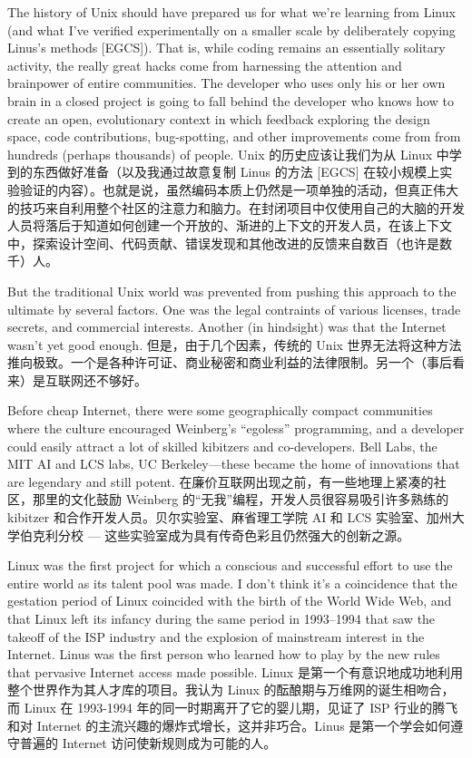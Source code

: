 \documentclass[a4paper,12pt,UTF8,twoside]{ctexbook}
\begin{document}
The history of Unix should have prepared us for what we're learning from Linux (and what I've verified experimentally on a smaller scale by deliberately copying Linus's methods [EGCS]). That is, while coding remains an essentially solitary activity, the really great hacks come from harnessing the attention and brainpower of entire communities. The developer who uses only his or her own brain in a closed project is going to fall behind the developer who knows how to create an open, evolutionary context in which feedback exploring the design space, code contributions, bug-spotting, and other improvements come from from hundreds (perhaps thousands) of people.
Unix 的历史应该让我们为从 Linux 中学到的东西做好准备（以及我通过故意复制 Linus 的方法 [EGCS] 在较小规模上实验验证的内容）。也就是说，虽然编码本质上仍然是一项单独的活动，但真正伟大的技巧来自利用整个社区的注意力和脑力。在封闭项目中仅使用自己的大脑的开发人员将落后于知道如何创建一个开放的、渐进的上下文的开发人员，在该上下文中，探索设计空间、代码贡献、错误发现和其他改进的反馈来自数百（也许是数千）人。

But the traditional Unix world was prevented from pushing this approach to the ultimate by several factors. One was the legal contraints of various licenses, trade secrets, and commercial interests. Another (in hindsight) was that the Internet wasn't yet good enough.
但是，由于几个因素，传统的 Unix 世界无法将这种方法推向极致。一个是各种许可证、商业秘密和商业利益的法律限制。另一个（事后看来）是互联网还不够好。

Before cheap Internet, there were some geographically compact communities where the culture encouraged Weinberg's ``egoless'' programming, and a developer could easily attract a lot of skilled kibitzers and co-developers. Bell Labs, the MIT AI and LCS labs, UC Berkeley—these became the home of innovations that are legendary and still potent.
在廉价互联网出现之前，有一些地理上紧凑的社区，那里的文化鼓励 Weinberg 的“无我”编程，开发人员很容易吸引许多熟练的 kibitzer 和合作开发人员。贝尔实验室、麻省理工学院 AI 和 LCS 实验室、加州大学伯克利分校 — 这些实验室成为具有传奇色彩且仍然强大的创新之源。

Linux was the first project for which a conscious and successful effort to use the entire world as its talent pool was made. I don't think it's a coincidence that the gestation period of Linux coincided with the birth of the World Wide Web, and that Linux left its infancy during the same period in 1993–1994 that saw the takeoff of the ISP industry and the explosion of mainstream interest in the Internet. Linus was the first person who learned how to play by the new rules that pervasive Internet access made possible.
Linux 是第一个有意识地成功地利用整个世界作为其人才库的项目。我认为 Linux 的酝酿期与万维网的诞生相吻合，而 Linux 在 1993-1994 年的同一时期离开了它的婴儿期，见证了 ISP 行业的腾飞和对 Internet 的主流兴趣的爆炸式增长，这并非巧合。Linus 是第一个学会如何遵守普遍的 Internet 访问使新规则成为可能的人。
\end{document}
